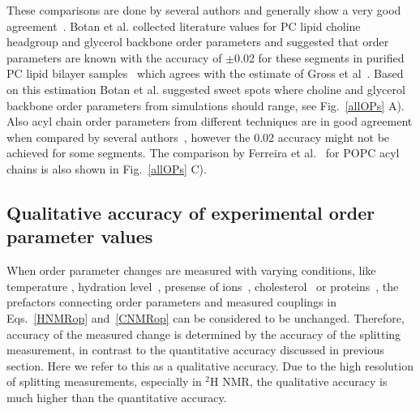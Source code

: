 \documentclass[aps,prl,superscriptaddress,twocolumn]{revtex4}
\begin{document}
These comparisons are done by several authors and generally show a very good 
agreement~\cite{gross97,dvinskikh05a,ferreira13,botan15,leftin14}.
Botan et al. collected literature values for PC lipid choline headgroup and glycerol backbone order parameters 
and suggested that order parameters are known with the accuracy of $\pm$0.02 for these segments in 
purified PC lipid bilayer samples~\cite{botan15} which agrees with the estimate of Gross et al~\cite{gross97}. 
Based on this estimation Botan et al. suggested sweet spots where choline and glycerol backbone order parameters from simulations should range, see Fig.~\ref{allOPs} A). Also acyl chain order parameters from different techniques 
are in good agreement when compared by several authors~\cite{gross97,dvinskikh05a,ferreira13,leftin14},
however the 0.02 accuracy might not be achieved for some segments.%
The comparison by Ferreira et al.~\cite{ferreira13} for POPC acyl chains is also shown in Fig.~\ref{allOPs} C). 







\subsection{Qualitative accuracy of experimental order parameter values}

When order parameter changes are measured with varying conditions, like temperature \cite{seelig74,seelig77,douliez95}, 
hydration level~\cite{bechinger91,ulrich94,mallikarjunaiah11,dvinskikh05a}, presense of ions~\cite{akutsu81,altenbach84,seelig87,scherer89}, 
cholesterol~\cite{brown78,douliez95,ferreira13,leftin14} or proteins~\cite{kuchinka89,roux90,leftin13},
the prefactors connecting order parameters and measured couplings in Eqs.~\ref{HNMRop} and~\ref{CNMRop} can be considered 
to be unchanged. Therefore, accuracy of the measured change is determined by the accuracy of the splitting 
measurement, in contrast to the quantitative accuracy discussed in previous section. Here we refer to this 
as a qualitative accuracy. Due to the high resolution of splitting measurements, especially in $^2$H NMR, 
the qualitative accuracy is much higher than the quantitative accuracy.
\end{document}

